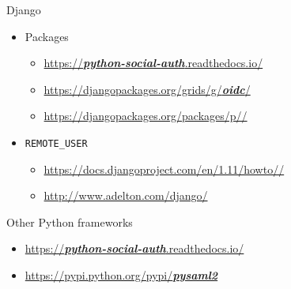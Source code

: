 \documentclass[ignorenonframetext,aspectratio=169]{beamer}
\providecommand{\tightlist}{%
  \setlength{\itemsep}{0pt}\setlength{\parskip}{0pt}}
\begin{document}
\begin{frame}{Django}
\begin{itemize}

\item Packages
    \begin{itemize}
    \tightlist
    \item \href{https://python-social-auth.readthedocs.io/}{
            \ttfamily https://{\large \bfseries \em python-social-auth}.readthedocs.io/}
    \item \href{https://djangopackages.org/grids/g/oidc/}{
            \ttfamily https://djangopackages.org/grids/g/{\large \bfseries \em oidc}/}
    \item \href{https://djangopackages.org/packages/p/djangosaml2/}{
            \ttfamily https://djangopackages.org/packages/p/\hspace{0px}{\large \bfseries \em djangosaml2}/}
    \end{itemize}

\item {\tt REMOTE\_USER}
    \begin{itemize}
    \tightlist
    \item \href{https://docs.djangoproject.com/en/1.11/howto/auth-remote-user/}{
            \ttfamily https://docs.djangoproject.com/en/1.11/howto/\hspace{0px}{\large \bfseries \em auth-remote-user}/}
    \item \href{http://www.adelton.com/django/external-authentication-for-django-projects}{
            \ttfamily http://www.adelton.com/django/\hspace{0px}{\large \bfseries \em external-authentication-for-django-projects}}
    \end{itemize}

\end{itemize}
\end{frame}

\begin{frame}{Other Python frameworks}
\begin{itemize}
\item \href{https://python-social-auth.readthedocs.io/}{
        \ttfamily https://{\large \bfseries \em python-social-auth}.readthedocs.io/}
\item \href{https://pypi.python.org/pypi/pysaml2}{
        \ttfamily https://pypi.python.org/pypi/{\large \bfseries \em pysaml2}}
\end{itemize}
\end{frame}
\end{document}
